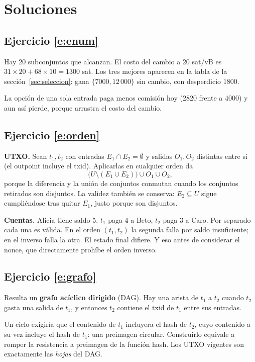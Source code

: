 \documentclass[11pt,a4paper]{article}
\theoremstyle{definition}
\theoremstyle{plain}
\theoremstyle{remark}
\begin{document}
\appendix
\section{Soluciones}\label{app:sol}

\subsection*{Ejercicio \ref{e:enum}}
Hay 20 subconjuntos que alcanzan. El costo del cambio a 20 sat/vB es
$31 \times 20 + 68 \times 10 = 1300$ sat. Los tres mejores aparecen en la tabla
de la sección~\ref{sec:seleccion}: gana $\{7000, 12\,000\}$ sin cambio, con
desperdicio 1800.

La opción de una sola entrada paga menos comisión hoy (2820 frente a 4000) y aun
así pierde, porque arrastra el costo del cambio.

\subsection*{Ejercicio \ref{e:orden}}
\textbf{UTXO.} Sean $t_1, t_2$ con entradas $E_1 \cap E_2 = \emptyset$ y salidas
$O_1, O_2$ distintas entre sí (el outpoint incluye el txid). Aplicarlas en
cualquier orden da
\[
  \bigl(U \setminus (E_1 \cup E_2)\bigr) \cup O_1 \cup O_2,
\]
porque la diferencia y la unión de conjuntos conmutan cuando los conjuntos
retirados son disjuntos. La validez también se conserva: $E_2 \subseteq U$ sigue
cumpliéndose tras quitar $E_1$, justo porque son disjuntos.

\textbf{Cuentas.} Alicia tiene saldo 5. $t_1$ paga 4 a Beto, $t_2$ paga 3 a
Caro. Por separado cada una es válida. En el orden $(t_1,t_2)$ la segunda falla
por saldo insuficiente; en el inverso falla la otra. El estado final difiere. Y
eso antes de considerar el nonce, que directamente prohíbe el orden inverso.

\subsection*{Ejercicio \ref{e:grafo}}
Resulta un \textbf{grafo acíclico dirigido} (DAG). Hay una arista de $t_1$ a
$t_2$ cuando $t_2$ gasta una salida de $t_1$, y entonces $t_2$ contiene el txid
de $t_1$ entre sus entradas.

Un ciclo exigiría que el contenido de $t_1$ incluyera el hash de $t_2$, cuyo
contenido a su vez incluye el hash de $t_1$: una preimagen circular. Construirlo
equivale a romper la resistencia a preimagen de la función hash. Los UTXO
vigentes son exactamente las \emph{hojas} del DAG.
\end{document}
